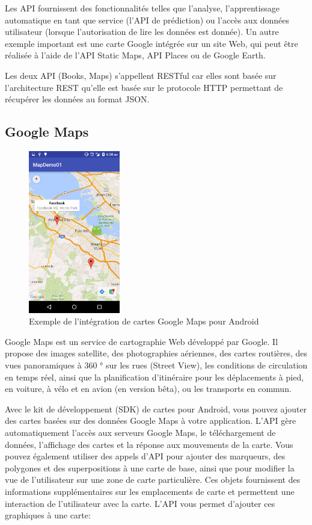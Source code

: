Les API fournissent des fonctionnalités telles que l'analyse, l'apprentissage automatique en tant que service (l'API de prédiction) ou l'accès aux données utilisateur (lorsque l'autorisation de lire les données est donnée). Un autre exemple important est une carte Google intégrée sur un site Web, qui peut être réalisée à l'aide de l'API Static Maps, API Places ou de Google Earth.\cite{noauthor_google_2019}

Les deux API (Books, Maps) s'appellent RESTful car elles sont basée sur l'architecture \gls{REST} qu'elle est basée sur le protocole \acrshort{HTTP} permettant de récupérer les données au format \acrshort{JSON}.

\subsection{Google Maps}

\begin{figure}
	\includegraphics[width=4cm]{Images/chapter3/maps_android_sdk.png}
	\caption{{\footnotesize Exemple de l'intégration de cartes Google Maps pour Android}}
\end{figure}

Google Maps est un service de cartographie Web développé par Google. Il propose des images satellite, des photographies aériennes, des cartes routières, des vues panoramiques à 360 ° sur les rues (Street View), les conditions de circulation en temps réel, ainsi que la planification d'itinéraire pour les déplacements à pied, en voiture, à vélo et en avion (en version bêta), ou les transports en commun.

Avec le kit de développement (SDK) de cartes pour Android, vous pouvez ajouter des cartes basées sur des données Google Maps à votre application. L'API gère automatiquement l'accès aux serveurs Google Maps, le téléchargement de données, l'affichage des cartes et la réponse aux mouvements de la carte. Vous pouvez également utiliser des appels d'API pour ajouter des marqueurs, des polygones et des superpositions à une carte de base, ainsi que pour modifier la vue de l'utilisateur sur une zone de carte particulière. Ces objets fournissent des informations supplémentaires sur les emplacements de carte et permettent une interaction de l'utilisateur avec la carte. L'API vous permet d'ajouter ces graphiques à une carte:

